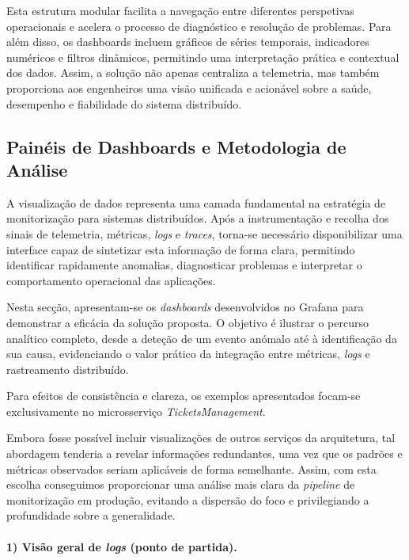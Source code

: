 Esta estrutura modular facilita a navegação entre diferentes perspetivas operacionais e acelera o processo de diagnóstico e resolução de problemas. Para além disso, os dashboards incluem gráficos de séries temporais, indicadores numéricos e filtros dinâmicos, permitindo uma interpretação prática e contextual dos dados. Assim, a solução não apenas centraliza a telemetria, mas também proporciona aos engenheiros uma visão unificada e acionável sobre a saúde, desempenho e fiabilidade do sistema distribuído.

\subsection{Painéis de Dashboards e Metodologia de Análise}

A visualização de dados representa uma camada fundamental na estratégia de monitorização 
para sistemas distribuídos. Após a instrumentação e recolha dos sinais de telemetria, métricas, \textit{logs} e \textit{traces}, torna-se necessário disponibilizar uma interface 
capaz de sintetizar esta informação de forma clara, permitindo identificar rapidamente 
anomalias, diagnosticar problemas e interpretar o comportamento operacional das aplicações.

Nesta secção, apresentam-se os \textit{dashboards} desenvolvidos no Grafana para demonstrar a 
eficácia da solução proposta. O objetivo é ilustrar o percurso analítico completo, desde 
a deteção de um evento anómalo até à identificação da sua causa, evidenciando o valor 
prático da integração entre métricas, \textit{logs} e rastreamento distribuído.

Para efeitos de consistência e clareza, os exemplos apresentados focam-se exclusivamente no 
microsserviço \textit{TicketsManagement}.

Embora fosse possível incluir visualizações de outros serviços da arquitetura, tal abordagem tenderia a revelar informações redundantes, uma vez que os padrões e métricas observados seriam aplicáveis de forma semelhante. Assim, com esta escolha conseguimos proporcionar uma análise mais clara da \textit{pipeline} de monitorização em produção, evitando a dispersão do foco e privilegiando a profundidade sobre a generalidade.

\paragraph{1) Visão geral de \textit{logs} (ponto de partida).}

